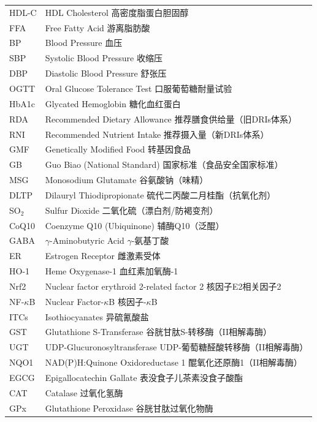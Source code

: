 \begin{table}[H]
\begin{tabularx}{\textwidth}{lX}
HDL-C & HDL Cholesterol \hfill 高密度脂蛋白胆固醇 \\
FFA & Free Fatty Acid \hfill 游离脂肪酸 \\
BP & Blood Pressure \hfill 血压 \\
SBP & Systolic Blood Pressure \hfill 收缩压 \\
DBP & Diastolic Blood Pressure \hfill 舒张压 \\
OGTT & Oral Glucose Tolerance Test \hfill 口服葡萄糖耐量试验 \\
HbA1c & Glycated Hemoglobin \hfill 糖化血红蛋白 \\
RDA & Recommended Dietary Allowance \hfill 推荐膳食供给量（旧DRIs体系） \\
RNI & Recommended Nutrient Intake \hfill 推荐摄入量（新DRIs体系） \\
GMF & Genetically Modified Food \hfill 转基因食品 \\
GB & Guo Biao (National Standard) \hfill 国家标准（食品安全国家标准） \\
MSG & Monosodium Glutamate \hfill 谷氨酸钠（味精） \\
DLTP & Dilauryl Thiodipropionate \hfill 硫代二丙酸二月桂酯（抗氧化剂） \\
SO$_2$ & Sulfur Dioxide \hfill 二氧化硫（漂白剂/防褐变剂） \\
CoQ10 & Coenzyme Q10 (Ubiquinone) \hfill 辅酶Q10（泛醌） \\
GABA & $\gamma$-Aminobutyric Acid \hfill $\gamma$-氨基丁酸 \\
ER & Estrogen Receptor \hfill 雌激素受体 \\
HO-1 & Heme Oxygenase-1 \hfill 血红素加氧酶-1 \\
Nrf2 & Nuclear factor erythroid 2-related factor 2 \hfill 核因子E2相关因子2 \\
NF-$\kappa$B & Nuclear Factor-$\kappa$B \hfill 核因子-$\kappa$B \\
ITCs & Isothiocyanates \hfill 异硫氰酸盐 \\
GST & Glutathione S-Transferase \hfill 谷胱甘肽S-转移酶（II相解毒酶） \\
UGT & UDP-Glucuronosyltransferase \hfill UDP-葡萄糖醛酸转移酶（II相解毒酶） \\
NQO1 & NAD(P)H:Quinone Oxidoreductase 1 \hfill 醌氧化还原酶1（II相解毒酶） \\
EGCG & Epigallocatechin Gallate \hfill 表没食子儿茶素没食子酸酯 \\
CAT & Catalase \hfill 过氧化氢酶 \\
GPx & Glutathione Peroxidase \hfill 谷胱甘肽过氧化物酶 \\

\end{tabularx}
\end{table}
